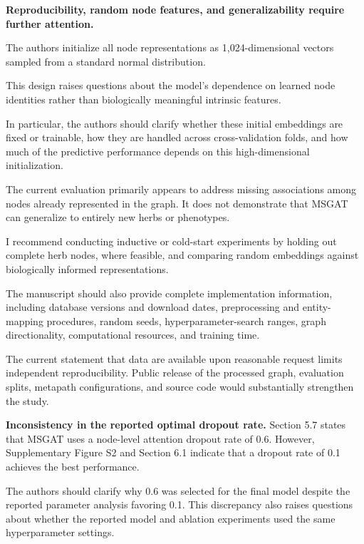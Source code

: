 \documentclass[11pt,american]{article}
\begin{document}
\begin{revcomment}
\textbf{Reproducibility, random node features, and generalizability require further attention.}

The authors initialize all node representations as 1,024-dimensional vectors sampled from a standard normal distribution.

This design raises questions about the model's dependence on learned node identities rather than biologically meaningful intrinsic features.

In particular, the authors should clarify whether these initial embeddings are fixed or trainable, how they are handled across cross-validation folds, and how much of the predictive performance depends on this high-dimensional initialization.

The current evaluation primarily appears to address missing associations among nodes already represented in the graph. It does not demonstrate that MSGAT can generalize to entirely new herbs or phenotypes.

I recommend conducting inductive or cold-start experiments by holding out complete herb nodes, where feasible, and comparing random embeddings against biologically informed representations.

The manuscript should also provide complete implementation information, including database versions and download dates, preprocessing and entity-mapping procedures, random seeds, hyperparameter-search ranges, graph directionality, computational resources, and training time.

The current statement that data are available upon reasonable request limits independent reproducibility. Public release of the processed graph, evaluation splits, metapath configurations, and source code would substantially strengthen the study.
\end{revcomment}

\begin{revresponse}

\end{revresponse}


\begin{revcomment}
\textbf{Inconsistency in the reported optimal dropout rate.} Section 5.7 states that MSGAT uses a node-level attention dropout rate of 0.6. However, Supplementary Figure S2 and Section 6.1 indicate that a dropout rate of 0.1 achieves the best performance.

The authors should clarify why 0.6 was selected for the final model despite the reported parameter analysis favoring 0.1. This discrepancy also raises questions about whether the reported model and ablation experiments used the same hyperparameter settings.
\end{revcomment}
\end{document}
